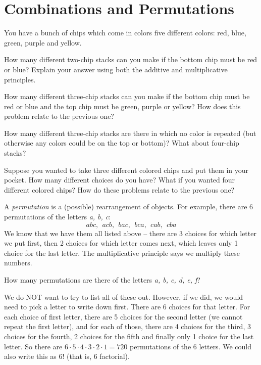 \documentclass[12pt]{article}
\begin{document}
\section{Combinations and Permutations}

\begin{activity}
You have a bunch of chips which come in colors five different colors: red, blue, green, purple and yellow.
\begin{questions} 

\question How many different two-chip stacks can you make if the bottom chip must be red or blue?  Explain your answer using both the additive and multiplicative principles.

\question How many different three-chip stacks can you make if the bottom chip must be red or blue and the top chip must be green, purple or yellow?  How does this problem relate to the previous one?

\question How many different three-chip stacks are there in which no color is repeated (but otherwise any colors could be on the top or bottom)? What about four-chip stacks?

\question Suppose you wanted to take three different colored chips and put them in your pocket.  How many different choices do you have?  What if you wanted four different colored chips?  How do these problems relate to the previous one?

\end{questions}
\end{activity}

A {\em permutation} is a (possible) rearrangement of objects.  For example, there are 6 permutations of the letters \textit{a, b, c}:
\[abc, ~~ acb, ~~ bac, ~~bca, ~~ cab, ~~ cba\]
We know that we have them all listed above -- there are 3 choices for which letter we put first, then 2 choices for which letter comes next, which leaves only 1 choice for the last letter.  The multiplicative principle says we multiply these numbers.

\begin{example}
  How many permutations are there of the letters \textit{a, b, c, d, e, f}?
  \begin{solution}
    We do NOT want to try to list all of these out.  However, if we did, we would need to pick a letter to write down first.  There are 6 choices for that letter.  For each choice of first letter, there are 5 choices for the second letter (we cannot repeat the first letter), and for each of those, there are 4 choices for the third, 3 choices for the fourth, 2 choices for the fifth and finally only 1 choice for the last letter.  So there are $6 \cdot 5 \cdot 4 \cdot 3 \cdot 2 \cdot 1 = 720$ permutations of the 6 letters.  We could also write this as $6!$ (that is, 6 factorial).
  \end{solution}
\end{example}
\end{document}
